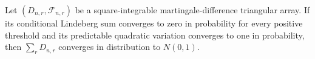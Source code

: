 Let \((D_{n,r},\mathcal F_{n,r})\) be a square-integrable martingale-difference triangular array.  If its conditional Lindeberg sum converges to zero in probability for every positive threshold and its predictable quadratic variation converges to one in probability, then \(\sum_rD_{n,r}\) converges in distribution to \(N(0,1)\).